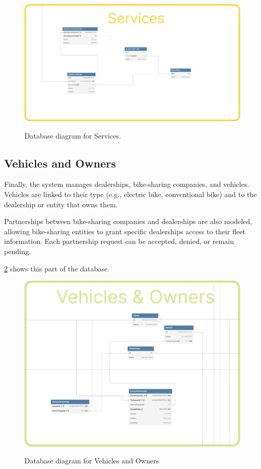 \begin{figure}[h]
  \caption{Database diagram for Services.}
  \centering
  \includegraphics[width=\textwidth]{figs/dbDiagrams/Services}
  \label{fig:dbServices}
\end{figure}


\subsection{Vehicles and Owners} 


Finally, the system manages dealerships, bike-sharing companies, and vehicles. Vehicles are linked to their type (e.g., electric bike, conventional bike) and to the dealership or entity that owns them.

Partnerships between bike-sharing companies and dealerships are also modeled, allowing bike-sharing entities to grant specific dealerships access to their fleet information. Each partnership request can be accepted, denied, or remain pending.

\ref{fig:dbVehicles} shows this part of the database.

\begin{figure}[h]
  \caption{Database diagram for Vehicles and Owners}
  \centering
  \includegraphics[width=\textwidth]{figs/dbDiagrams/Vehicles_and_Owners}
  \label{fig:dbVehicles}
\end{figure}


